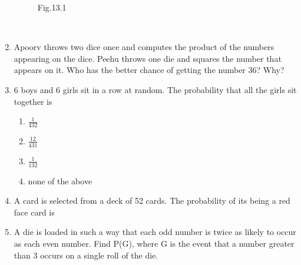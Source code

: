 \begin{enumerate}[label=\thesection.\arabic*,ref=\thesection.\theenumi]
\begin{figure}[!ht]
\begin{center}
		\resizebox{\columnwidth}{!}{}
	\end{center}
	\caption{Fig.13.1}
	\label{fig:circle.tex}	
\end{figure}\\
\solution

\item Apoorv throws two dice once and computes the product of the numbers appearing on the dice. Peehu throws one die and squares the number that appears on it. Who has the better chance of getting the number 36? Why?\\
\solution

\item 6 boys and 6 girls sit in a row at random. The probability that all the girls sit
together is
\begin{enumerate}
	\item $\frac{1}{432}$
	\item $\frac{12}{431}$
	\item $\frac{1}{132}$
	\item none of the above 
\end{enumerate}
			
\item A card is selected from a deck of 52 cards. The probability of its being a red face card is

\item A die is loaded in such a way that each odd number is twice as likely to occur as each even number. Find P(G), where G is the event that a number greater than 3 occurs on a single roll of the die.\\



\end{enumerate}
